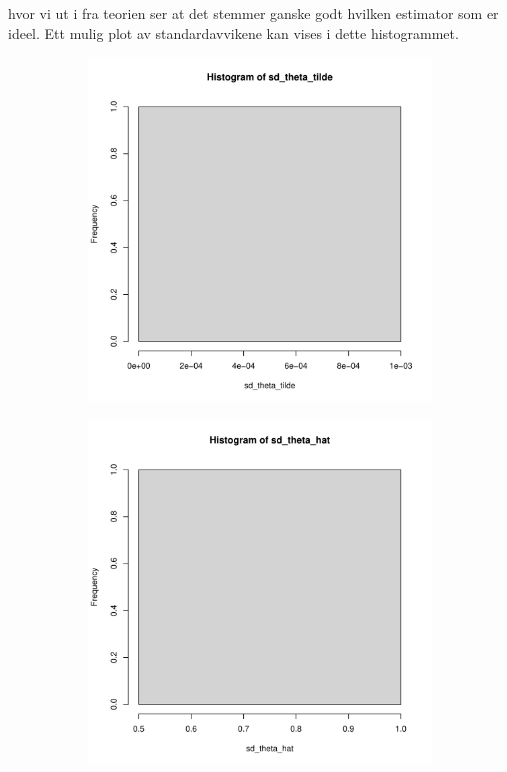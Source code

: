 \documentclass[12pt,
               a4paper,
               article,
               oneside,
               oldfontcommands,
               norsk]{memoir}
\begin{document}
hvor vi ut i fra teorien ser at det stemmer ganske godt hvilken estimator som er ideel. Ett mulig plot av standardavvikene kan vises i dette histogrammet.
\begin{figure}[H]
	\centering
	\begin{subfigure}[H]{0.8\textwidth}
	\centering
	\includegraphics[width=\textwidth]{estimatorer.pdf}
	\end{subfigure}
	\vfill
	\begin{subfigure}[H]{0.8\textwidth}
	\centering
	\includegraphics[width=\textwidth]{estimatorer1.pdf} 
	\end{subfigure}
\end{figure}
\end{document}
